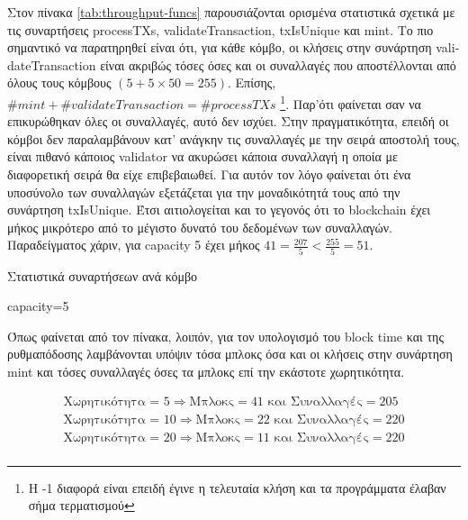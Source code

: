 \documentclass{article}
\newcommand{\eng}[1]{\foreignlanguage{english}{#1}} %
\begin{document}
Στον πίνακα \ref{tab:throughput-funcs} παρουσιάζονται ορισμένα στατιστικά
σχετικά με τις συναρτήσεις \eng{processTXs}, \eng{validateTransaction},
\eng{txIsUnique} και \eng{mint}. Το πιο σημαντικό να παρατηρηθεί είναι ότι, για
κάθε κόμβο, οι κλήσεις στην συνάρτηση \eng{validateTransaction} είναι ακριβώς
τόσες όσες και οι συναλλαγές που αποστέλλονται από όλους τους κόμβους $\left(5
+ 5 \times 50 = 255 \right)$. Επίσης, $\#mint + \#validateTransaction =
\#processTXs$ \footnote{Η -1 διαφορά είναι επειδή έγινε η τελευταία κλήση και τα
προγράμματα έλαβαν σήμα τερματισμού}. Παρ'ότι φαίνεται σαν να επικυρώθηκαν όλες
οι συναλλαγές, αυτό δεν ισχύει. Στην πραγματικότητα, επειδή οι κόμβοι δεν 
παραλαμβάνουν κατ' ανάγκην τις συναλλαγές με την σειρά αποστολή τους, είναι πιθανό
κάποιος \eng{validator} να ακυρώσει κάποια συναλλαγή η οποία με διαφορετική σειρά
θα είχε επιβεβαιωθεί. Για αυτόν τον λόγο φαίνεται ότι ένα υποσύνολο των
συναλλαγών εξετάζεται για την μοναδικότητά τους από την συνάρτηση
\eng{txIsUnique}. Έτσι αιτιολογείται και το γεγονός ότι το \eng{blockchain}
έχει μήκος μικρότερο από το μέγιστο δυνατό του δεδομένων των συναλλαγών.
Παραδείγματος χάριν, για \eng{capacity 5} έχει μήκος $41 = \frac{207}{5} <
\frac{255}{5} = 51$.


\begin{table}[ht]
    \caption{Στατιστικά συναρτήσεων ανά κόμβο} 
    \label{tab:throughput-funcs}
    \begin{subtable}{\textwidth}
        \centering
        \caption{\eng{capacity=5}}
        \label{tab:throughput-funcs-1}
    \end{subtable}
\end{table}

Όπως φαίνεται από τον πίνακα, λοιπόν, για τον υπολογισμό του \eng{block time} και
της ρυθμαπόδοσης λαμβάνονται υπόψιν τόσα μπλοκς όσα και οι κλήσεις στην συνάρτηση
\eng{mint} και τόσες συναλλαγές όσες τα μπλοκς επί την εκάστοτε χωρητικότητα.

\begin{equation}
    \begin{gathered}
        \text{Χωρητικότητα = 5} \Rightarrow \text{Μπλοκς} = 41 \text{ και } \text{Συναλλαγές} = 205 \\
        \text{Χωρητικότητα = 10} \Rightarrow \text{Μπλοκς} = 22 \text{ και } \text{Συναλλαγές} = 220 \\
        \text{Χωρητικότητα = 20} \Rightarrow \text{Μπλοκς} = 11 \text{ και } \text{Συναλλαγές} = 220 \\
    \end{gathered}
\end{equation}
\end{document}
